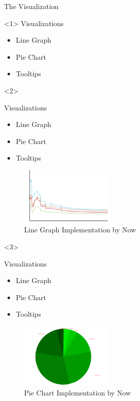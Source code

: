 \documentclass{beamer}
\begin{document}
\begin{frame}{The Visualization}
\begin{onlyenv}<1>
Visualizations
\begin{itemize}
\item Line Graph
\item Pie Chart
\item Tooltips
\end{itemize}
\end{onlyenv}

\begin{onlyenv}<2>
\begin{minipage}[hbt]{0.45\textwidth}
Visualizations
\begin{itemize}
\item Line Graph
\item Pie Chart
\item Tooltips
\end{itemize}
\end{minipage}
\begin{minipage}[hbt]{0.45\textwidth}
	\begin{figure}
	\centering
	\includegraphics[width=4.5cm]{lines.png}
	\caption{Line Graph Implementation by Now}
	\end{figure}
\end{minipage}
\end{onlyenv}

\begin{onlyenv}<3>
\begin{minipage}[hbt]{0.45\textwidth}
Visualizations
\begin{itemize}
\item Line Graph
\item Pie Chart
\item Tooltips
\end{itemize}
\end{minipage}
\begin{minipage}[hbt]{0.45\textwidth}
	\begin{figure}
	\centering
	\includegraphics[width=4.5cm]{pie.png}
	\caption{Pie Chart Implementation by Now}
	\end{figure}
\end{minipage}
\end{onlyenv}


\end{frame}
\end{document}
